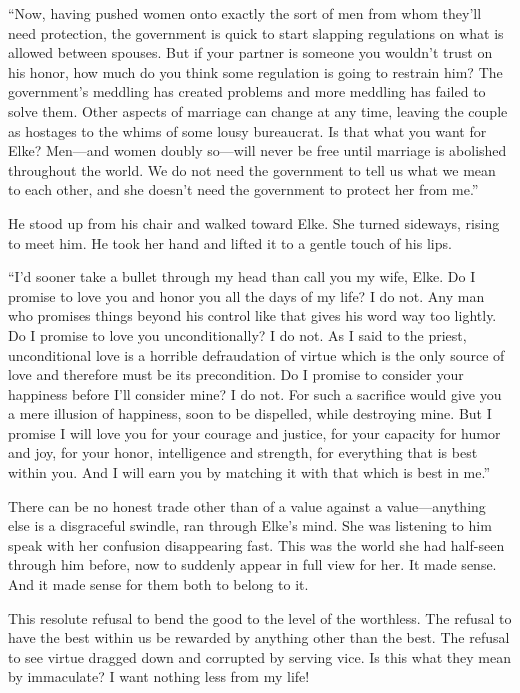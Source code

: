 ``Now, having pushed women onto exactly the sort of men from whom they'll need protection, the government is quick to start slapping regulations on what is allowed between spouses. But if your partner is someone you wouldn't trust on his honor, how much do you think some regulation is going to restrain him? The government's meddling has created problems and more meddling has failed to solve them. Other aspects of marriage can change at any time, leaving the couple as hostages to the whims of some lousy bureaucrat. Is that what you want for Elke? Men---and women doubly so---will never be free until marriage is abolished throughout the world. We do not need the government to tell us what we mean to each other, and she doesn't need the government to protect her from me.''

He stood up from his chair and walked toward Elke. She turned sideways, rising to meet him. He took her hand and lifted it to a gentle touch of his lips.

``I'd sooner take a bullet through my head than call you my wife, Elke. Do I promise to love you and honor you all the days of my life? I do not. Any man who promises things beyond his control like that gives his word way too lightly. Do I promise to love you unconditionally? I do not. As I said to the priest, unconditional love is a horrible defraudation of virtue which is the only source of love and therefore must be its precondition. Do I promise to consider your happiness before I'll consider mine? I do not. For such a sacrifice would give you a mere illusion of happiness, soon to be dispelled, while destroying mine. But I promise I will love you for your courage and justice, for your capacity for humor and joy, for your honor, intelligence and strength, for everything that is best within you. And I will earn you by matching it with that which is best in me.''

There can be no honest trade other than of a value against a value---anything else is a disgraceful swindle, ran through Elke's mind. She was listening to him speak with her confusion disappearing fast. This was the world she had half-seen through him before, now to suddenly appear in full view for her. It made sense. And it made sense for them both to belong to it.

This resolute refusal to bend the good to the level of the worthless. The refusal to have the best within us be rewarded by anything other than the best. The refusal to see virtue dragged down and corrupted by serving vice. Is this what they mean by immaculate? I want nothing less from my life!

